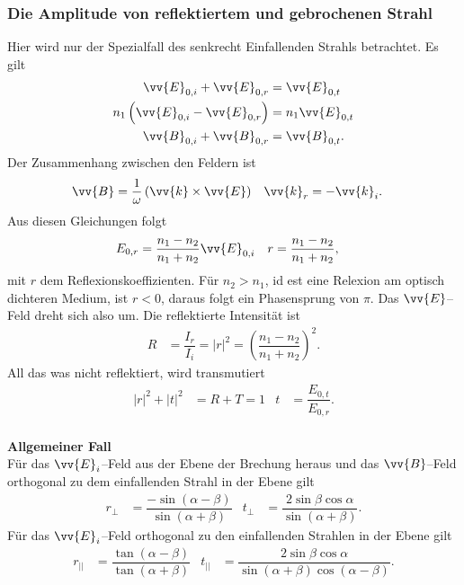 \documentclass[a4paper,12pt]{article}
\numberwithin{equation}{section}
\begin{document}
\subsubsection{Die Amplitude von reflektiertem und gebrochenen Strahl}
Hier wird nur der Spezialfall des senkrecht Einfallenden Strahls betrachtet. Es gilt
\begin{align} 
        \vv{E}_{0,i}+\vv{E}_{0,r}&=\vv{E}_{0,t}\\
        n_1\left(\vv{E}_{0,i}-\vv{E}_{0,r}\right)&=n_1\vv{E}_{0,t}\\
        \vv{B}_{0,i}+\vv{B}_{0,r}&=\vv{B}_{0,t}
.\end{align} 
Der Zusammenhang zwischen den Feldern ist
\begin{align} 
        \vv{B}&=\dfrac{1}{\omega }\left(\vv{k}\times \vv{E}\right)&\vv{k}_r&=-\vv{k}_i
.\end{align} 
Aus diesen Gleichungen folgt
\begin{align} 
        E_{0,r}&=\dfrac{n_1-n_2}{n_1+n_2}\vv{E}_{0,i}&r&=\dfrac{n_1-n_2}{n_1+n_2}
,\end{align} 
mit $r$ dem Reflexionskoeffizienten. Für $n_2>n_1$, id est eine Relexion am optisch dichteren Medium, ist $r<0$, daraus folgt ein Phasensprung von $\pi $. Das $\vv{E}$--Feld dreht sich also um. Die reflektierte Intensität ist
\begin{align} 
        R&=\dfrac{I_r}{I_i}=|r|^2=\left(\dfrac{n_1-n_2}{n_1+n_2}\right)^2
.\end{align} 
All das was nicht reflektiert, wird transmutiert
\begin{align} 
        |r|^2+|t|^2&=R+T=1&t&=\dfrac{E_{0,t}}{E_{0,r}}
.\end{align} 
\hfill\\\textbf{Allgemeiner Fall}\\ 
Für das $\vv{E}_i$--Feld aus der Ebene der Brechung heraus und das $\vv{B}$--Feld orthogonal zu dem einfallenden Strahl in der Ebene gilt
\begin{align} 
        r_\perp &=\dfrac{-\sin \left(\alpha -\beta \right)}{\sin \left(\alpha +\beta \right)}&t_\perp&=\dfrac{2\sin \beta \cos \alpha }{\sin \left(\alpha +\beta \right)}
.\end{align} 
Für das $\vv{E}_i$--Feld orthogonal zu den einfallenden Strahlen in der Ebene gilt
\begin{align} 
        r_{| |}&=\dfrac{\tan \left(\alpha -\beta \right)}{\tan \left(\alpha +\beta \right)}&t_{| |}&=\dfrac{2\sin \beta \cos \alpha }{\sin \left(\alpha +\beta \right)\cos \left(\alpha -\beta \right)}
.\end{align} 
\end{document}
